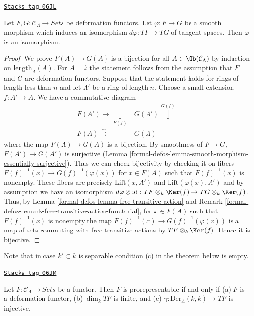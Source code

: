 \begin{lemma}
\label{formal-defos-lemma-minimal-smooth-morphism-functors}
\href{https://stacks.math.columbia.edu/tag/06JL}{\texttt{Stacks tag 06JL}}

Let $F, G: \mathcal{C}_\Lambda \to \textit{Sets}$ be deformation
functors. Let $\varphi : F \to G$ be a smooth morphism which induces
an isomorphism $d\varphi : TF \to TG$ of tangent
spaces. Then $\varphi$ is an isomorphism.
\end{lemma}

\begin{proof}
We prove $F(A) \to G(A)$ is a bijection for all $A \in
\Ob(\mathcal{C}_\Lambda)$ by induction on
$\text{length}_A(A)$.  For $A = k$ the statement follows from the
assumption that $F$ and $G$ are deformation functors. Suppose that the
statement holds for rings of length less than $n$ and let $A'$ be a ring of
length $n$. Choose a small extension $f : A' \to A$.  We have a
commutative diagram
$$
\begin{array}{cc}F(A') \longrightarrow\underset{F(f)}{\downarrow} & G(A') \overset{G(f)}{\downarrow} \\ F(A) \overset{\sim}{\longrightarrow} & G(A)\end{array}
$$
where the map $F(A) \to G(A)$ is a bijection.  By smoothness of $F
\to G$, $F(A') \to G(A')$ is surjective (Lemma
\ref{formal-defos-lemma-smooth-morphism-essentially-surjective}).  Thus we can check
bijectivity by checking it on fibers $F(f)^{-1}(x) \to
G(f)^{-1}(\varphi(x))$ for $x \in F(A)$ such that $F(f)^{-1}(x)$ is nonempty.
These fibers are precisely $\text{Lift}(x, A')$ and
$\text{Lift}(\varphi(x), A')$ and by assumption we have an isomorphism
$d\varphi \otimes \text{id} :
TF \otimes_k \Ker(f)  \to TG \otimes_k \Ker(f)$.
Thus, by
Lemma \ref{formal-defos-lemma-free-transitive-action} and
Remark \ref{formal-defos-remark-free-transitive-action-functorial},
for $x \in F(A)$ such that $F(f)^{-1}(x)$ is nonempty the map
$F(f)^{-1}(x) \to G(f)^{-1}(\varphi(x))$ is a map of sets commuting
with free transitive actions by $TF \otimes_k \Ker(f)$.
Hence it is bijective.
\end{proof}

Note that in case $k' \subset k$ is separable condition (c) in
the theorem below is empty.

\begin{theorem}
\label{formal-defos-theorem-Schlessinger-prorepresentability}
\href{https://stacks.math.columbia.edu/tag/06JM}{\texttt{Stacks tag 06JM}}

Let $F: \mathcal{C}_\Lambda \to \textit{Sets}$ be a functor.
Then $F$ is prorepresentable if and only if
(a) $F$ is a deformation functor,
(b) $\dim_k TF$ is finite, and (c) $\gamma : \text{Der}_\Lambda(k, k) \to TF$
is injective.
\end{theorem}

